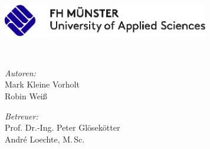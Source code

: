 
\begin{titlepage}
	\begin{center}
        \large  

        \hfill

        \vfill
        
        \includegraphics[width=9cm]{Figures/Logo-FH-Muenster} \\ \medskip
        
        \myDepartment
        
        \vfill

        \begingroup
            \color{Maroon}\spacedallcaps{\Large\myTitle} \\ \bigskip
        \endgroup

        \spacedlowsmallcaps{\myName}
        
        \vfill
        
        \begin{minipage}{0.4\textwidth}
			\begin{flushleft}
			\emph{Autoren:} \\
			Mark Kleine Vorholt\\
			Robin Wei\ss{}
			\end{flushleft}
			\end{minipage}
			\hfill
			\begin{minipage}{0.5\textwidth}
			\begin{flushright}
			\emph{Betreuer:} \\
			Prof. Dr.-Ing. Peter Glösekötter \\
			André Loechte, M.\,Sc.
			\end{flushright}
		\end{minipage}

        
        \vfill
        
        \textit{\mySubtitle} \\
            
        \vfill              
        
        \myTime   
        
        \vfill  

	\end{center}     
\end{titlepage}   